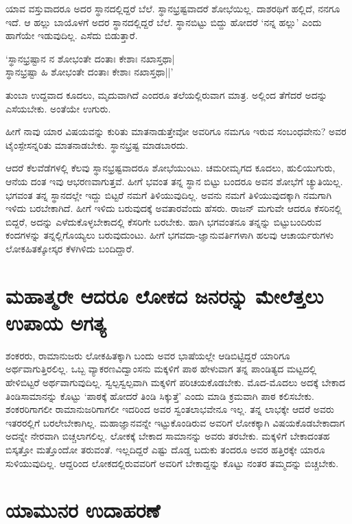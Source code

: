 ಯಾವ ವಸ್ತುವಾದರೂ ಅದರ ಸ್ಥಾನದಲ್ಲಿದ್ದರೆ ಬೆಲೆ. ಸ್ಥಾನಭ್ರಷ್ಟವಾದರೆ ಶೋಭೆಯಿಲ್ಲ. ದಾಶರಥಿಗೆ ಹಲ್ಲಿದೆ, ನನಗೂ ಇದೆ. ಆ ಹಲ್ಲು ಬಾಯೊಳಗೆ ಅದರ ಸ್ಥಾನದಲ್ಲಿದ್ದರೆ ಬೆಲೆ. ಸ್ಥಾನಬಿಟ್ಟು ಬಿದ್ದು ಹೋದರೆ `ನನ್ನ ಹಲ್ಲು' ಎಂದು ಹಾಗೆಯೇ ಇಡುವುದಿಲ್ಲ. ಎಸೆದು ಬಿಡುತ್ತಾರೆ.

\begin{shloka}
`ಸ್ಥಾನಭ್ರಷ್ಟಾನ ನ ಶೋಭಂತೇ ದಂತಾಃ ಕೇಶಾಃ ನಖಾಸ್ತಥಾ|\\
ಸ್ಥಾನಭ್ರಷ್ಟಾ ಹಿ ಶೋಭಂತೇ ದಂತಾಃ ಕೇಶಾಃ ನಖಾಸ್ತಥಾ||'
\end{shloka}

ತುಂಬಾ ಉದ್ದವಾದ ಕೂದಲು, ಮೃದುವಾಗಿದೆ ಎಂದರೂ ತಲೆಯಲ್ಲಿರುವಾಗ ಮಾತ್ರ. ಅಲ್ಲಿಂದ ತೆಗೆದರೆ ಅದನ್ನು ಎಸೆಯಬೇಕು. ಅಂತೆಯೇ ಉಗುರು.

ಹೀಗೆ ನಾವು ಯಾರ ವಿಷಯವನ್ನು ಕುರಿತು ಮಾತನಾಡುತ್ತೇವೋ ಅವರಿಗೂ ನಮಗೂ ಇರುವ ಸಂಬಂಧವೇನು? ಅವರ ಟೈಂಸ್ಪೇಸನ್ನರಿತು ಮಾತನಾಡಬೇಕು. ಸ್ಥಾನಭ್ರಷ್ಟ ಮಾಡಬಾರದು.

ಆದರೆ ಕೆಲವೆಡೆಗಳಲ್ಲಿ ಕೆಲವು ಸ್ಥಾನಭ್ರಷ್ಟವಾದರೂ ಶೋಭೆಯುಂಟು. ಚಮರೀಮೃಗದ ಕೂದಲು, ಹುಲಿಯುಗುರು, ಆನೆಯ ದಂತ ಇವು ಆಭರಣವಾಗುತ್ತವೆ. ಹೀಗೆ ಭವಂತ ತನ್ನ ಸ್ಥಾನ ಬಿಟ್ಟು ಬಂದರೂ ಅವನ ಶೋಭೆಗೆ ಚ್ಯುತಿಯಿಲ್ಲ. ಭಗವಂತ ತನ್ನ ಸ್ಥಾನದಲ್ಲೇ ಇದ್ದು ಬಿಟ್ಟರೆ ನಮಗೆ ತಿಳಿಯುವುದಿಲ್ಲ. ಅವನು ನಮಗೆ ತಿಳಿಯುವುದಕ್ಕಾಗಿ ನಮಗಾಗಿ ಇಳಿದು ಬರಬೇಕಾಗಿದೆ. ಹೀಗೆ ಇಳಿದು ಬರುವುದಕ್ಕೆ  ಅವತಾರವೆಂದು ಹೆಸರು. ರಾಜನ್ ಮಗುವೇ ಆದರೂ ಕೆಸರಿನಲ್ಲಿ ಬಿದ್ದರೆ, ಅದನ್ನು ಎಳೆದುಕೊಳ್ಳಬೇಕಾದಲ್ಲಿ ಕೆಸರಿಗೇ ಬರಬೇಕು. ಹಾಗಿ ಭಗವಂತನೂ ತನ್ನನ್ನು ಬಿಟ್ಟುಬಂದಿರುವ ಕಂದಗಳನ್ನು ತನ್ನಲ್ಲಿಗೊಯ್ಯಲು ಬರುವುದುಂಟು. ಹೀಗೆ ಭಗವದಾ-ಜ್ಞಾನುವರ್ತಿಗಳಾಗಿ ಹಲವು ಆಚಾರ್ಯರುಗಳು ಲೋಕಹಿತಕ್ಕೋಸ್ಕರ ಕೆಳಗಿಳಿದು ಬಂದಿದ್ದಾರೆ. 

\section*{ಮಹಾತ್ಮರೇ ಆದರೂ ಲೋಕದ ಜನರನ್ನು ಮೇಲೆತ್ತಲು ಉಪಾಯ ಅಗತ್ಯ}

ಶಂಕರರು, ರಾಮಾನುಜರು ಲೋಕಹಿತಕ್ಕಾಗಿ ಬಂದು ಅವರ ಭಾಷೆಯಲ್ಲೇ ಆಡಿಬಿಟ್ಟಿದ್ದರೆ ಯಾರಿಗೂ ಅರ್ಥವಾಗುತ್ತಿರಲಿಲ್ಲ. ಒಬ್ಬ ವ್ಯಾಕರಣವಿದ್ವಾಂಸನು ಮಕ್ಕಳಿಗೆ ಪಾಠ ಹೇಳುವಾಗ ತನ್ನ ಪಾಂಡಿತ್ಯದ ಮಟ್ಟದಲ್ಲಿ ಹೇಳಿಬಿಟ್ಟರೆ ಅರ್ಥವಾಗುವುದಿಲ್ಲ. ಸ್ವಲ್ಪಸ್ವಲ್ಪವಾಗಿ ಮಕ್ಕಳಿಗೆ ಪರಿಚಯಕೊಡಬೇಕು. ಮೊದ-ಮೊದಲು ಅದಕ್ಕೆ ಬೇಕಾದ ತಿಂಡಿಸಾಮಾನನ್ನು ಕೊಟ್ಟು `ಪಾಠಕ್ಕೆ ಹೋದರೆ ತಿಂಡಿ ಸಿಕ್ಕುತ್ತೆ' ಎಂದು ಮಾಡಿ ಕ್ರಮವಾಗಿ ಪಾಠ ಕಲಿಸಬೇಕು. ಶಂಕರರಿಗಾಗಲೀ ರಾಮಾನುಜರಿಗಾಗಲೀ ಇದರಿಂದ ಅವರ ಸ್ವಂತಲಾಭವೇನೂ ಇಲ್ಲ. ತನ್ನ ಲಾಭಕ್ಕೇ ಆದರೆ ಅವರು ಇತರರಲ್ಲಿಗೆ ಬರಲೇಬೇಕಾಗಿಲ್ಲ. ಮಹಾಜ್ಞಾನವನ್ನೇ ಇಟ್ಟುಕೊಂಡಿರುವ ಅವರಿಗೆ ಲೋಕಕ್ಕಾಗಿ ವಿಷಯಕೊಡಬೇಕಾದಾಗ ಅದನ್ನೇ ನೇರವಾಗಿ ಬಿಚ್ಚಲಾಗಲಿಲ್ಲ. ಲೋಕಕ್ಕೆ ಬೇಕಾದ ಸಾಮಾನನ್ನು ಅವರು ತರಬೇಕು. ಮಕ್ಕಳಿಗೆ ಬೇಕಾದಂತಹ ಬಿಸ್ಕತ್ತೋ ಮತ್ತೊಂದೋ ತರುವಂತೆ. ಇಲ್ಲದಿದ್ದರೆ ಎಷ್ಟು  ದೊಡ್ಡ ಬದುಕು ತಂದರೂ ಅವರ ಹತ್ತಿರಕ್ಕೇ ಯಾರೂ ಸುಳಿಯುವುದಿಲ್ಲ. ಆದ್ದರಿಂದ ಲೋಕದಲ್ಲಿರುವವರಿಗೆ ಅವರಿಗೆ ಬೇಕಾದ್ದನ್ನು ಕೊಟ್ಟು ನಂತರ ತಮ್ಮದನ್ನು ಬಿಚ್ಚಬೇಕು.


\section*{ಯಾಮುನರ ಉದಾಹರಣೆ}


